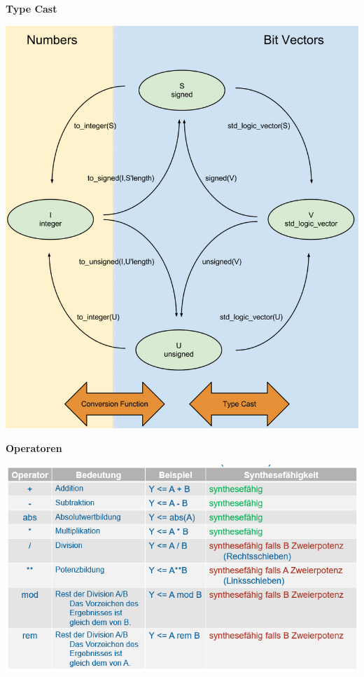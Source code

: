 \noindent\textbf{Type Cast}
\begin{center}
	\includegraphics[width=0.8\columnwidth]{Images/type_cast}
\end{center}

\noindent\textbf{Operatoren}
\begin{center}
	\includegraphics[width=\columnwidth]{Images/type_operator}
\end{center}
